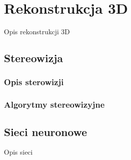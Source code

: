 \chapter{Rekonstrukcja 3D}
Opis rekonstrukcji 3D

\section{Stereowizja}

\subsection{Opis sterowizji}
\subsection{Algorytmy stereowizyjne}

\section{Sieci neuronowe}
Opis sieci

